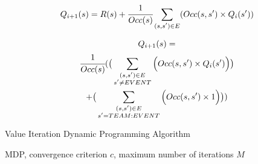 \documentclass[]{article}
\begin{document}
\begin{equation}
\label{equation:value-iteration-expected}
Q_{i+1}(s) = R(s) + \cfrac{1}{Occ(s)}\sum_{\substack{(s,s') \in E}}(Occ(s,s')\times Q_{i}(s'))
\end{equation}

\begin{multline}
\label{equation:value-iteration-probability}
Q_{i+1}(s) = \\
\cfrac{1}{Occ(s)}(\big(\sum_{\substack{(s,s') \in E \\ s' \neq EVENT}}\Big(Occ(s,s') \times Q_{i}(s')\Big)\big) \\
+ \big(\sum_{\substack{(s,s') \in E \\ s' = TEAM:EVENT}}\Big(Occ(s,s') \times 1\Big)\big))
\end{multline}


\begin{algorithm}
\caption{Value Iteration Dynamic Programming Algorithm}
\label{alg:value-iteration-dynamic}
\begin{algorithmic}[1]
\REQUIRE MDP, convergence criterion $c$, maximum number of iterations $M$
        \ENDIF
    \ENDFOR
        \ENDIF
    \ENDIF
\ENDFOR
\end{algorithmic}
\end{algorithm}

\end{document}
